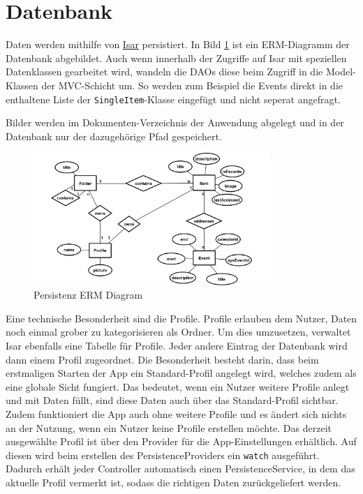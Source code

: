 \section{Datenbank}

Daten werden mithilfe von \href{https://pub.dev/packages/isar}{Isar} persistiert. In Bild \ref{img:erm} ist ein ERM-Diagramm der Datenbank abgebildet.
Auch wenn innerhalb der Zugriffe auf Isar mit speziellen Datenklassen gearbeitet wird, wandeln die DAOs diese beim Zugriff in die
Model-Klassen der MVC-Schicht um. So werden zum Beispiel die Events direkt in die enthaltene Liste der \verb|SingleItem|-Klasse eingefügt und nicht seperat angefragt.

Bilder werden im Dokumenten-Verzeichnis der Anwendung abgelegt und in der Datenbank nur der dazugehörige Pfad gespeichert.

\begin{figure}[H]
  \centering
  \includegraphics[width=0.8\textwidth]{figures/persistenz_erm.png}
  \caption{Persistenz ERM Diagram}
  \label{img:erm}
\end{figure}

Eine technische Besonderheit sind die Profile. Profile erlauben dem Nutzer, Daten noch einmal grober zu kategorisieren als Ordner.
Um dies umzusetzen, verwaltet Isar ebenfalls eine Tabelle für Profile. Jeder andere Eintrag der Datenbank wird dann einem Profil zugeordnet.
Die Besonderheit besteht darin, dass beim erstmaligen Starten der App ein Standard-Profil angelegt wird, welches zudem als eine globale Sicht fungiert.
Das bedeutet, wenn ein Nutzer weitere Profile anlegt und mit Daten füllt, sind diese Daten auch über das Standard-Profil sichtbar.
Zudem funktioniert die App auch ohne weitere Profile und es ändert sich nichts an der Nutzung, wenn ein Nutzer keine Profile erstellen möchte.
Das derzeit ausgewählte Profil ist über den Provider für die App-Einstellungen erhältlich. Auf diesen wird beim erstellen des PersistenceProviders ein \verb|watch| ausgeführt.
Dadurch erhält jeder Controller automatisch einen PersistenceService, in dem das aktuelle Profil vermerkt ist, sodass die richtigen Daten zurückgeliefert werden.

